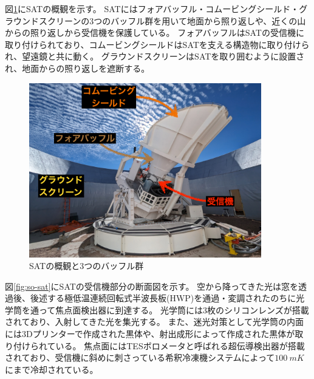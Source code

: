 \documentclass[../../main.tex]{subfiles}
\begin{document}
図\ref{fig:so-sat_overview}にSATの概観を示す。
SATにはフォアバッフル・コムービングシールド・グラウンドスクリーンの3つのバッフル群を用いて地面から照り返しや、近くの山からの照り返しから受信機を保護している。
フォアバッフルはSATの受信機に取り付けられており、コムービングシールドはSATを支える構造物に取り付けられ、望遠鏡と共に動く。
グラウンドスクリーンはSATを取り囲むように設置され、地面からの照り返しを遮断する。
\begin{figure}
    \centering
    \includegraphics[width=0.9\textwidth]{simons_observatory/sat_overview.pdf}
    \caption{SATの概観と3つのバッフル群}
    \label{fig:so-sat_overview}
\end{figure}

図\ref{fig:so-sat}にSATの受信機部分の断面図を示す。
空から降ってきた光は窓を透過後、後述する極低温連続回転式半波長板(HWP)を通過・変調されたのちに光学筒を通って焦点面検出器に到達する。
光学筒には3枚のシリコンレンズが搭載されており、入射してきた光を集光する。
また、迷光対策として光学筒の内面には3Dプリンターで作成された黒体\cite{Adachi_2020}や、射出成形によって作成された黒体が取り付けられている。
焦点面にはTESボロメータと呼ばれる超伝導検出器が搭載されており、受信機に斜めに刺さっている希釈冷凍機システムによって$\SI{100}{mK}$にまで冷却されている\cite{Kiuchi_2020}。
\end{document}
